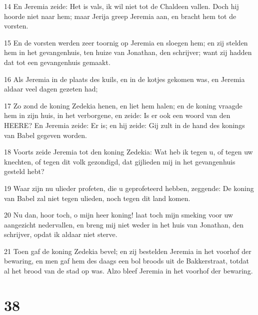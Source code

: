 \par 14 En Jeremia zeide: Het is vals, ik wil niet tot de Chaldeen vallen. Doch hij hoorde niet naar hem; maar Jerija greep Jeremia aan, en bracht hem tot de vorsten.
\par 15 En de vorsten werden zeer toornig op Jeremia en sloegen hem; en zij stelden hem in het gevangenhuis, ten huize van Jonathan, den schrijver; want zij hadden dat tot een gevangenhuis gemaakt.
\par 16 Als Jeremia in de plaats des kuils, en in de kotjes gekomen was, en Jeremia aldaar veel dagen gezeten had;
\par 17 Zo zond de koning Zedekia henen, en liet hem halen; en de koning vraagde hem in zijn huis, in het verborgene, en zeide: Is er ook een woord van den HEERE? En Jeremia zeide: Er is; en hij zeide: Gij zult in de hand des konings van Babel gegeven worden.
\par 18 Voorts zeide Jeremia tot den koning Zedekia: Wat heb ik tegen u, of tegen uw knechten, of tegen dit volk gezondigd, dat gijlieden mij in het gevangenhuis gesteld hebt?
\par 19 Waar zijn nu ulieder profeten, die u geprofeteerd hebben, zeggende: De koning van Babel zal niet tegen ulieden, noch tegen dit land komen.
\par 20 Nu dan, hoor toch, o mijn heer koning! laat toch mijn smeking voor uw aangezicht nedervallen, en breng mij niet weder in het huis van Jonathan, den schrijver, opdat ik aldaar niet sterve.
\par 21 Toen gaf de koning Zedekia bevel; en zij bestelden Jeremia in het voorhof der bewaring, en men gaf hem des daags een bol broods uit de Bakkerstraat, totdat al het brood van de stad op was. Alzo bleef Jeremia in het voorhof der bewaring.

\chapter{38}

